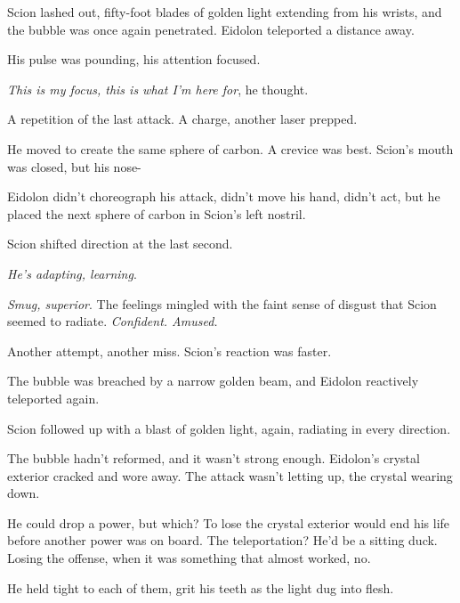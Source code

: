Scion lashed out, fifty-foot blades of golden light extending from his wrists, and the bubble was once again penetrated.  Eidolon teleported a distance away.



His pulse was pounding, his attention focused.



\emph{This is my focus, this is what I'm here for}, he thought.



A repetition of the last attack.  A charge, another laser prepped.



He moved to create the same sphere of carbon.  A crevice was best.  Scion's mouth was closed, but his nose-



Eidolon didn't choreograph his attack, didn't move his hand, didn't act, but he placed the next sphere of carbon in Scion's left nostril.



Scion shifted direction at the last second.



\emph{He's adapting, learning}.



\emph{Smug, superior}.  The feelings mingled with the faint sense of disgust that Scion seemed to radiate.  \emph{Confident.  Amused.}



Another attempt, another miss.  Scion's reaction was faster.



The bubble was breached by a narrow golden beam, and Eidolon reactively teleported again.



Scion followed up with a blast of golden light, again, radiating in every direction.



The bubble hadn't reformed, and it wasn't strong enough.  Eidolon's crystal exterior cracked and wore away.  The attack wasn't letting up, the crystal wearing down.



He could drop a power, but which?  To lose the crystal exterior would end his life before another power was on board.  The teleportation?  He'd be a sitting duck.  Losing the offense, when it was something that almost worked, no.



He held tight to each of them, grit his teeth as the light dug into flesh.



